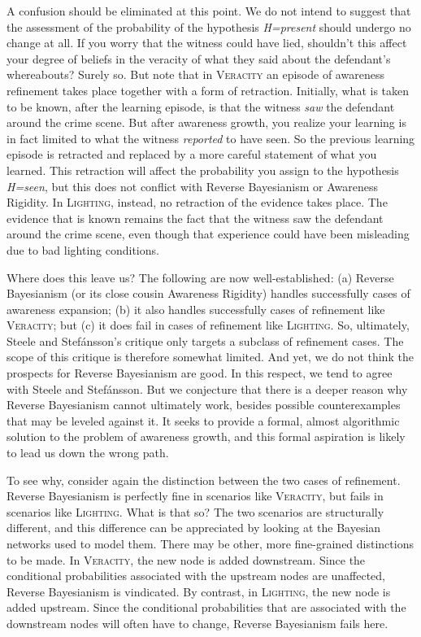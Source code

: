 \documentclass[
  11pt,
  dvipsnames,enabledeprecatedfontcommands]{scrartcl}
\begin{document}
A confusion should be eliminated at this point. We do not intend to
suggest that the assessment of the probability of the hypothesis
\textit{H=present} should undergo no change at all. If you worry that
the witness could have lied, shouldn't this affect your degree of
beliefs in the veracity of what they said about the defendant's
whereabouts? Surely so. But note that in \textsc{Veracity} an episode of
awareness refinement takes place together with a form of retraction.
Initially, what is taken to be known, after the learning episode, is
that the witness \textit{saw} the defendant around the crime scene. But
after awareness growth, you realize your learning is in fact limited to
what the witness \textit{reported} to have seen. So the previous
learning episode is retracted and replaced by a more careful statement
of what you learned. This retraction will affect the probability you
assign to the hypothesis \textit{H=seen}, but this does not conflict
with Reverse Bayesianism or Awareness Rigidity. In \textsc{Lighting},
instead, no retraction of the evidence takes place. The evidence that is
known remains the fact that the witness saw the defendant around the
crime scene, even though that experience could have been misleading due
to bad lighting conditions.

Where does this leave us? The following are now well-established: (a)
Reverse Bayesianism (or its close cousin Awareness Rigidity) handles
successfully cases of awareness expansion; (b) it also handles
successfully cases of refinement like \textsc{Veracity}; but (c) it does
fail in cases of refinement like \textsc{Lighting}. So, ultimately,
Steele and Stefánsson's critique only targets a subclass of refinement
cases. The scope of this critique is therefore somewhat limited. And
yet, we do not think the prospects for Reverse Bayesianism are good. In
this respect, we tend to agree with Steele and Stefánsson. But we
conjecture that there is a deeper reason why Reverse Bayesianism cannot
ultimately work, besides possible counterexamples that may be leveled
against it. It seeks to provide a formal, almost algorithmic solution to
the problem of awareness growth, and this formal aspiration is likely to
lead us down the wrong path.

To see why, consider again the distinction between the two cases of
refinement. Reverse Bayesianism is perfectly fine in scenarios like
\textsc{Veracity}, but fails in scenarios like \textsc{Lighting}. What
is that so? The two scenarios are structurally different, and this
difference can be appreciated by looking at the Bayesian networks used
to model them. There may be other, more fine-grained distinctions to be
made. In \textsc{Veracity}, the new node is added downstream. Since the
conditional probabilities associated with the upstream nodes are
unaffected, Reverse Bayesianism is vindicated. By contrast, in
\textsc{Lighting}, the new node is added upstream. Since the conditional
probabilities that are associated with the downstream nodes will often
have to change, Reverse Bayesianism fails here.
\end{document}
